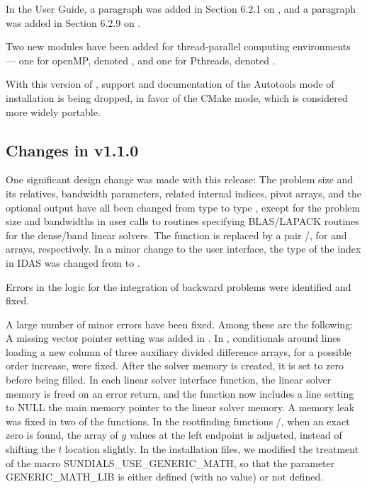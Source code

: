 In the User Guide, a paragraph was added in Section 6.2.1 on
, and a paragraph was added in Section 6.2.9 on
.

Two new {\nvector} modules have been added for thread-parallel computing
environments --- one for openMP, denoted ,
and one for Pthreads, denoted .

With this version of {\sundials}, support and documentation of the
Autotools mode of installation is being dropped, in favor of the
CMake mode, which is considered more widely portable.

\subsection*{Changes in v1.1.0}

One significant design change was made with this release: The problem
size and its relatives, bandwidth parameters, related internal indices,
pivot arrays, and the optional output  have all been
changed from type  to type , except for the
problem size and bandwidths in user calls to routines specifying
BLAS/LAPACK routines for the dense/band linear solvers.  The function
 is replaced by a pair /,
for  and  arrays, respectively.  In a minor
change to the user interface, the type of the index  in
IDAS was changed from  to .

Errors in the logic for the integration of backward problems were
identified and fixed.

A large number of minor errors have been fixed.  Among these are the following:
A missing vector pointer setting was added in .
In , conditionals around lines loading a new column of three
auxiliary divided difference arrays, for a possible order increase, were fixed.
After the solver memory is created, it is set to zero before being filled.
In each linear solver interface function, the linear solver memory is
freed on an error return, and the  function now includes a
line setting to NULL the main memory pointer to the linear solver memory.
A memory leak was fixed in two of the  functions.
In the rootfinding functions /, when an exact
zero is found, the array  of $g$ values at the left endpoint is
adjusted, instead of shifting the $t$ location  slightly.
In the installation files, we modified the treatment of the macro
SUNDIALS\_USE\_GENERIC\_MATH, so that the parameter GENERIC\_MATH\_LIB is
either defined (with no value) or not defined.


